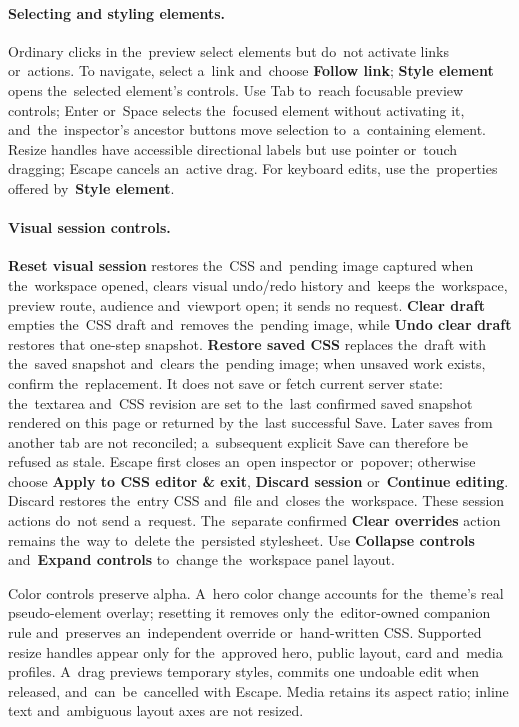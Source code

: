 \documentclass[11pt,a4paper]{article}
\newcommand{\ui}[1]{\textbf{#1}}
\begin{document}
\paragraph{Selecting and styling elements.} Ordinary clicks in the~preview
select elements but do~not activate links or~actions. To navigate, select a~link
and~choose \ui{Follow link}; \ui{Style element} opens the~selected element's
controls. Use Tab to~reach focusable preview controls; Enter or~Space selects
the~focused element without activating it, and~the~inspector's ancestor buttons
move selection to~a~containing element. Resize handles have accessible
directional labels but use pointer or~touch dragging; Escape cancels an~active
drag. For keyboard edits, use the~properties offered by~\ui{Style element}.

\paragraph{Visual session controls.} \ui{Reset visual session} restores the~CSS
and~pending image captured when the~workspace opened, clears visual undo/redo
history and~keeps the~workspace, preview route, audience and~viewport open; it
sends no request. \ui{Clear draft} empties the~CSS draft and~removes the~pending
image, while \ui{Undo clear draft} restores that one-step snapshot. \ui{Restore
saved CSS} replaces the~draft with the~saved snapshot and~clears the~pending
image; when unsaved work exists, confirm the~replacement. It does not save or
fetch current server state: the~textarea and~CSS revision are set to the~last
confirmed saved snapshot rendered on this page or returned by the~last
successful Save. Later saves from another tab are not reconciled; a~subsequent
explicit Save can therefore be refused as stale. Escape first closes an~open
inspector or~popover; otherwise choose \ui{Apply to CSS editor \& exit},
\ui{Discard session} or~\ui{Continue editing}. Discard restores the~entry CSS
and~file and~closes the~workspace. These session actions do~not send a~request.
The~separate confirmed \ui{Clear overrides} action remains the~way to~delete
the~persisted stylesheet. Use \ui{Collapse controls} and~\ui{Expand controls}
to~change the~workspace panel layout.

Color controls preserve alpha. A~hero color change accounts for the~theme's real
pseudo-element overlay; resetting it removes only the~editor-owned companion
rule and~preserves an~independent override or~hand-written CSS. Supported resize
handles appear only for the~approved hero, public layout, card and~media
profiles. A~drag previews temporary styles, commits one undoable edit when
released, and~can~be~cancelled with Escape. Media retains its aspect ratio;
inline text and~ambiguous layout axes are not resized.
\end{document}

